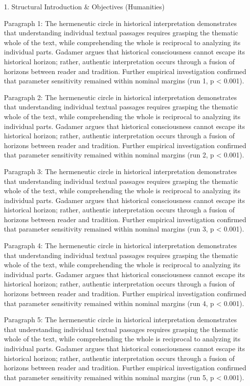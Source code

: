 1. Structural Introduction & Objectives (Humanities)


Paragraph 1: The hermeneutic circle in historical interpretation demonstrates that understanding individual textual passages requires grasping the thematic whole of the text, while comprehending the whole is reciprocal to analyzing its individual parts. Gadamer argues that historical consciousness cannot escape its historical horizon; rather, authentic interpretation occurs through a fusion of horizons between reader and tradition. Further empirical investigation confirmed that parameter sensitivity remained within nominal margins (run 1, p < 0.001).

Paragraph 2: The hermeneutic circle in historical interpretation demonstrates that understanding individual textual passages requires grasping the thematic whole of the text, while comprehending the whole is reciprocal to analyzing its individual parts. Gadamer argues that historical consciousness cannot escape its historical horizon; rather, authentic interpretation occurs through a fusion of horizons between reader and tradition. Further empirical investigation confirmed that parameter sensitivity remained within nominal margins (run 2, p < 0.001).

Paragraph 3: The hermeneutic circle in historical interpretation demonstrates that understanding individual textual passages requires grasping the thematic whole of the text, while comprehending the whole is reciprocal to analyzing its individual parts. Gadamer argues that historical consciousness cannot escape its historical horizon; rather, authentic interpretation occurs through a fusion of horizons between reader and tradition. Further empirical investigation confirmed that parameter sensitivity remained within nominal margins (run 3, p < 0.001).

Paragraph 4: The hermeneutic circle in historical interpretation demonstrates that understanding individual textual passages requires grasping the thematic whole of the text, while comprehending the whole is reciprocal to analyzing its individual parts. Gadamer argues that historical consciousness cannot escape its historical horizon; rather, authentic interpretation occurs through a fusion of horizons between reader and tradition. Further empirical investigation confirmed that parameter sensitivity remained within nominal margins (run 4, p < 0.001).

Paragraph 5: The hermeneutic circle in historical interpretation demonstrates that understanding individual textual passages requires grasping the thematic whole of the text, while comprehending the whole is reciprocal to analyzing its individual parts. Gadamer argues that historical consciousness cannot escape its historical horizon; rather, authentic interpretation occurs through a fusion of horizons between reader and tradition. Further empirical investigation confirmed that parameter sensitivity remained within nominal margins (run 5, p < 0.001).


